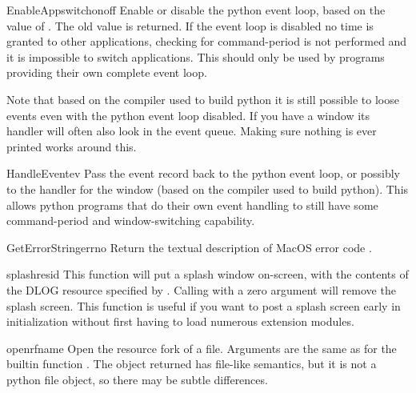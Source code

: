 \begin{funcdesc}{EnableAppswitch}{onoff}
Enable or disable the python event loop, based on the value of
. The old value is returned. If the event loop is disabled
no time is granted to other applications, checking for command-period
is not performed and it is impossible to switch applications. This
should only be used by programs providing their own complete event
loop.

Note that based on the compiler used to build python it is still
possible to loose events even with the python event loop disabled. If
you have a  window its handler will often also look
in the event queue. Making sure nothing is ever printed works around
this.
\end{funcdesc}

\begin{funcdesc}{HandleEvent}{ev}
Pass the event record  back to the python event loop, or
possibly to the handler for the  window (based on the
compiler used to build python). This allows python programs that do
their own event handling to still have some command-period and
window-switching capability.
\end{funcdesc}

\begin{funcdesc}{GetErrorString}{errno}
Return the textual description of MacOS error code .
\end{funcdesc}

\begin{funcdesc}{splash}{resid}
This function will put a splash window
on-screen, with the contents of the DLOG resource specified by
. Calling with a zero argument will remove the splash
screen. This function is useful if you want to post a splash screen
early in initialization without first having to load numerous
extension modules.
\end{funcdesc}

\begin{funcdesc}{openrf}{name }
Open the resource fork of a file. Arguments are the same as for the
builtin function . The object returned has file-like
semantics, but it is not a python file object, so there may be subtle
differences.
\end{funcdesc}
